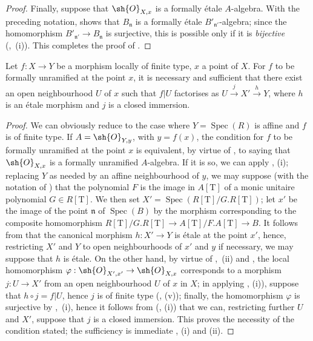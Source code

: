 \begin{proof}
Finally, suppose that $\sh{O}_{X,x}$ is a formally \'etale $A$-algebra.
With the preceding notation,  shows that $B_\mathfrak{n}$ is a formally \'etale $B'_{\mathfrak{n}'}$-algebra; since the homomorphism $B'_{\mathfrak{n}'}\to B_\mathfrak{n}$ is surjective, this is possible only if it is \emph{bijective} (,~(i)).
This completes the proof of .
\end{proof}

\begin{corollary}[18.4.7]
\label{IV.18.4.7}
Let $f:X\to Y$ be a morphism locally of finite type, $x$ a point of $X$.
For $f$ to be formally unramified at the point $x$, it is necessary and sufficient that there exist an open neighbourhood $U$ of $x$ such that $f|U$ factorises as $U\xrightarrow{j}X'\xrightarrow{h}Y$, where $h$ is an \'etale morphism and $j$ is a closed immersion.
\end{corollary}

\begin{proof}
We can obviously reduce to the case where $Y=\operatorname{Spec}(R)$ is affine and $f$ is of finite type.
If $A=\sh{O}_{Y,y}$, with $y=f(x)$, the condition for $f$ to be formally unramified at the point $x$ is equivalent, by virtue of , to saying that $\sh{O}_{X,x}$ is a formally unramified $A$-algebra.
If it is so, we can apply , (i);
replacing $Y$ as needed by an affine neighbourhood of $y$, we may suppose (with the notation of ) that the polynomial $F$ is the image in $A[\mathrm{T}]$ of a monic unitaire polynomial $G\in R[\mathrm{T}]$.
We then set $X'=\operatorname{Spec}(R[\mathrm{T}]/G.R[\mathrm{T}])$;
let $x'$ be the image of the point $\mathfrak{n}$ of $\operatorname{Spec}(B)$ by the morphism corresponding to the composite homomorphism $R[\mathrm{T}]/G.R[\mathrm{T}]\to A[\mathrm{T}]/F.A[\mathrm{T}]\to B$.
It follows from  that the canonical morphism $h:X'\to Y$ is \'etale at the point $x'$, hence, restricting $X'$ and $Y$ to open neighbourhoods of $x'$ and $y$ if necessary, we may suppose that $h$ is \'etale.
On the other hand, by virtue of ,~(ii) and , the local homomorphism $\varphi:\sh{O}_{X',x'}\to\sh{O}_{X,x}$ corresponds to a morphism
$j:U\to X'$ from an open neighbourhood $U$ of $x$ in $X$;
in applying , (i)), suppose that $h\circ j=f|U$, hence $j$ is of finite type (, (v));
finally, the homomorphism $\varphi$ is surjective by ,~(i), hence it follows from (, (i)) that we can, restricting further $U$ and $X'$, suppose that $j$ is a closed immersion.
This proves the necessity of the condition stated;
the sufficiency is immediate , (i) and (ii).
\end{proof}

